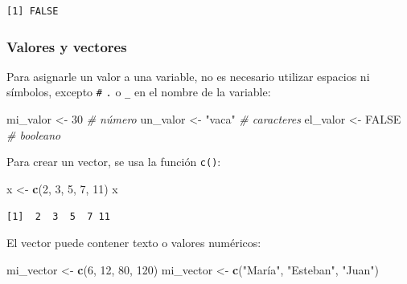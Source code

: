 \documentclass[
]{article}
\newenvironment{Shaded}{\begin{snugshade}}{\end{snugshade}}
\newcommand{\CommentTok}[1]{\textcolor[rgb]{0.56,0.35,0.01}{\textit{#1}}}
\newcommand{\ConstantTok}[1]{\textcolor[rgb]{0.56,0.35,0.01}{#1}}
\newcommand{\DecValTok}[1]{\textcolor[rgb]{0.00,0.00,0.81}{#1}}
\newcommand{\FunctionTok}[1]{\textcolor[rgb]{0.13,0.29,0.53}{\textbf{#1}}}
\newcommand{\NormalTok}[1]{#1}
\newcommand{\OtherTok}[1]{\textcolor[rgb]{0.56,0.35,0.01}{#1}}
\newcommand{\StringTok}[1]{\textcolor[rgb]{0.31,0.60,0.02}{#1}}
\begin{document}
\begin{verbatim}
[1] FALSE
\end{verbatim}

\hypertarget{valores-y-vectores}{%
\subsubsection{Valores y vectores}\label{valores-y-vectores}}

Para asignarle un valor a una variable, no es necesario utilizar espacios ni símbolos, excepto \texttt{\#} \texttt{.} o \texttt{\_} en el nombre de la variable:

\begin{Shaded}
\begin{Highlighting}[]
\NormalTok{mi\_valor }\OtherTok{\textless{}{-}} \DecValTok{30}  \CommentTok{\# número}
\NormalTok{un\_valor }\OtherTok{\textless{}{-}} \StringTok{"vaca"}  \CommentTok{\# caracteres}
\NormalTok{el\_valor }\OtherTok{\textless{}{-}} \ConstantTok{FALSE}  \CommentTok{\# booleano}
\end{Highlighting}
\end{Shaded}

Para crear un vector, se usa la función \texttt{c()}:

\begin{Shaded}
\begin{Highlighting}[]
\NormalTok{x }\OtherTok{\textless{}{-}} \FunctionTok{c}\NormalTok{(}\DecValTok{2}\NormalTok{, }\DecValTok{3}\NormalTok{, }\DecValTok{5}\NormalTok{, }\DecValTok{7}\NormalTok{, }\DecValTok{11}\NormalTok{)}
\NormalTok{x}
\end{Highlighting}
\end{Shaded}

\begin{verbatim}
[1]  2  3  5  7 11
\end{verbatim}

El vector puede contener texto o valores numéricos:

\begin{Shaded}
\begin{Highlighting}[]
\NormalTok{mi\_vector }\OtherTok{\textless{}{-}} \FunctionTok{c}\NormalTok{(}\DecValTok{6}\NormalTok{, }\DecValTok{12}\NormalTok{, }\DecValTok{80}\NormalTok{, }\DecValTok{120}\NormalTok{)}
\NormalTok{mi\_vector }\OtherTok{\textless{}{-}} \FunctionTok{c}\NormalTok{(}\StringTok{"María"}\NormalTok{, }\StringTok{"Esteban"}\NormalTok{, }\StringTok{"Juan"}\NormalTok{)}
\end{Highlighting}
\end{Shaded}
\end{document}
